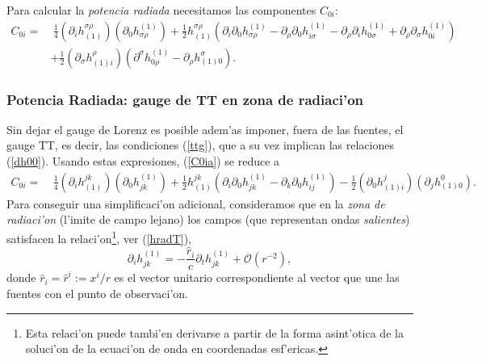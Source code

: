 Para calcular la \textit{potencia radiada} necesitamos las componentes $C_{0i}$:
\begin{align}
C_{0i} = & \  \frac{1}{4}(\partial_i h^{\sigma\rho}_{(1)})(\partial_0 h_{\sigma\rho}^{(1)}) +\frac{1}{2} h^{\sigma\rho}_{(1)}\left(\partial_i\partial_0 h^{(1)}_{\sigma\rho}-\partial_\rho\partial_0
h^{(1)}_{i\sigma}-\partial_\rho\partial_i h^{(1)}_{0\sigma}
+ \partial_\rho\partial_\sigma h^{(1)}_{0i}\right) \nonumber \\
& + \frac{1}{2} (\partial_\sigma h^\rho_{(1)i})\left(\partial^\sigma h^{(1)}_{0\rho}-\partial_\rho h^\sigma_{(1)0}\right). \label{C0ia}
\end{align}

\subsubsection{Potencia Radiada: gauge de TT en zona de radiaci'on}
Sin dejar el gauge de Lorenz es posible adem'as imponer, fuera de las fuentes, el gauge TT, es decir, las condiciones  (\ref{ttg}), que a su vez implican las relaciones (\ref{dh00}). Usando estas expresiones, (\ref{C0ia}) se reduce a
\begin{align}
C_{0i} = & \  \frac{1}{4}(\partial_i h^{jk}_{(1)})(\partial_0 h_{jk}^{(1)})
+\frac{1}{2}h^{jk}_{(1)}\left(\partial_i\partial_0 h^{(1)}_{jk} -\partial_k\partial_0 h^{(1)}_{ij}\right) - \frac{1}{2}(\partial_0 h^j_{(1)i})(\partial_j h^0_{(1)0}).
\end{align}
Para conseguir una simplificaci'on adicional, consideramos que en la \textit{zona de radiaci'on} (l'imite de campo lejano) los campos (que representan ondas \textit{salientes}) satisfacen la relaci'on\footnote{Esta relaci'on puede tambi'en derivarse a partir de la forma asint'otica de la soluci'on de la ecuaci'on de onda en coordenadas esf'ericas.}, ver (\ref{hradT}),
\begin{equation}\label{zrad}
\partial_i h^{(1)}_{jk}=-\frac{\hat{r}_i}{c}\partial_t h^{(1)}_{jk}+\mathcal{O}(r^{-2}),
\end{equation}
donde $\hat{r}_i=\hat{r}^i:=x^i/r$ es el vector unitario correspondiente al vector que une las fuentes con el punto de observaci'on.

